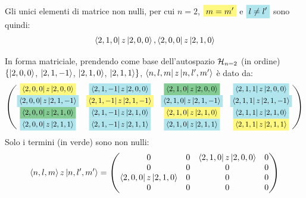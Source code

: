 \documentclass[../../FisicaTeorica.tex]{subfiles}
\begin{document}
Gli unici elementi di matrice non nulli, per cui $n=2$, $\hlc{Yellow}{m=m'}$ e $\hlc{SkyBlue}{l\neq l'}$ sono quindi:
\begin{align*}
\Bra{2,1,0}z \Ket{2,0,0}, \Bra{2,0,0}z \Ket{2,1,0}
\end{align*}

In forma matriciale, prendendo come base dell'autospazio $\mathcal{H}_{n=2}$ (in ordine) $\{\Ket{2,0,0}$, $\Ket{2,1,-1}$, $\Ket{2,1,0}$, $\Ket{2,1,1}\}$, $\Bra{n,l,m}z\Ket{n,l',m'}$ è dato da:
\begin{align*}
\begin{pmatrix}
\hlc{Yellow}{\bra{2,0,0}z\ket{2,0,0}} & \hlc{SkyBlue}{\bra{2,1,-1}z\ket{2,0,0}} & \hlc{ForestGreen}{\bra{2,1,0}z\ket{2,0,0}} & \hlc{SkyBlue}{\bra{2,1,1}z\ket{2,0,0}} \\
\hlc{SkyBlue}{\bra{2,0,0}z\ket{2,1,-1}} & \hlc{Yellow}{\bra{2,1,-1}z\ket{2,1,-1}} & \hlc{SkyBlue}{\bra{2,1,0}z\ket{2,1,-1}} & \hlc{SkyBlue}{\bra{2,1,1}z\ket{2,1,-1}}\\
\hlc{ForestGreen}{\bra{2,0,0}z\ket{2,1,0}} & \hlc{SkyBlue}{\bra{2,1,-1}z\ket{2,1,0}}& \hlc{Yellow}{\bra{2,1,0}z\ket{2,1,0}} & \hlc{SkyBlue}{\bra{2,1,1}z\ket{2,1,0}}\\
\hlc{SkyBlue}{\bra{2,0,0}z\ket{2,1,1}} & \hlc{SkyBlue}{\bra{2,1,-1}z\ket{2,1,1}} &\hlc{SkyBlue}{\bra{2,1,0}z\ket{2,1,1}} & \hlc{Yellow}{\bra{2,1,1}z\ket{2,1,1}}
\end{pmatrix}
\end{align*}
Solo i termini  (in verde) sono non nulli:
\begin{align*}
\Braket{n,l,m}z\Ket{n,l',m'} = \begin{pmatrix}
0 & 0 & \Bra{2,1,0}z\Ket{2,0,0} & 0\\
0 & 0 & 0 & 0\\
\Bra{2,0,0}z\Ket{2,1,0} & 0 & 0 & 0\\
0 & 0 & 0 & 0
\end{pmatrix}
\end{align*}
 
\end{document}
